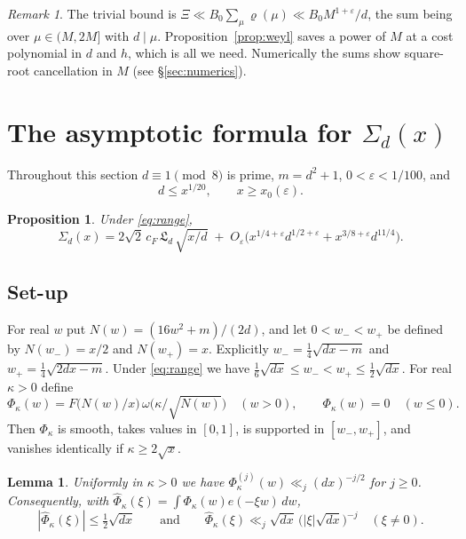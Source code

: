 \documentclass[11pt]{amsart}
\newtheorem{proposition}[theorem]{Proposition}
\newtheorem{lemma}[theorem]{Lemma}
\theoremstyle{remark}
\newtheorem{remark}[theorem]{Remark}
\theoremstyle{definition}
\numberwithin{equation}{section}
\newcommand{\eps}{\varepsilon}
\newcommand{\Lf}{\mathfrak{L}}
\begin{document}
\begin{remark}
The trivial bound is $\Xi\ll B_0\sum_{\mu}\varrho(\mu)\ll B_0M^{1+\eps}/d$, the sum being over $\mu\in(M,2M]$ with $d\mid\mu$. Proposition~\ref{prop:weyl} saves a power of $M$ at a cost polynomial in $d$ and $h$, which is all we need. Numerically the sums show square-root cancellation in $M$ (see \S\ref{sec:numerics}).
\end{remark}

\section{\texorpdfstring{The asymptotic formula for $\Sigma_d(x)$}{The asymptotic formula for Sigma\_d(x)}}\label{sec:asymp}

Throughout this section $d\equiv1\pmod8$ is prime, $m=d^2+1$, $0<\eps<1/100$, and
\begin{equation}\label{eq:range}
d\le x^{1/20},\qquad x\ge x_0(\eps).
\end{equation}

\begin{proposition}\label{prop:asymp}
Under \eqref{eq:range},
\[
\Sigma_d(x)=2\sqrt2\,c_F\,\Lf_d\,\sqrt{x/d}\;+\;O_\eps\bigl(x^{1/4+\eps}d^{1/2+\eps}+x^{3/8+\eps}d^{11/4}\bigr).
\]
\end{proposition}

\subsection{Set-up}
For real $w$ put $N(w)=(16w^2+m)/(2d)$, and let $0<w_-<w_+$ be defined by $N(w_-)=x/2$ and $N(w_+)=x$. Explicitly $w_-=\frac14\sqrt{dx-m}$ and $w_+=\frac14\sqrt{2dx-m}$. Under \eqref{eq:range} we have $\frac16\sqrt{dx}\le w_-<w_+\le\frac12\sqrt{dx}$. For real $\kappa>0$ define
\[
\Phi_\kappa(w)=F\bigl(N(w)/x\bigr)\,\omega\bigl(\kappa/\sqrt{N(w)}\bigr)\quad(w>0),\qquad\Phi_\kappa(w)=0\quad(w\le0).
\]
Then $\Phi_\kappa$ is smooth, takes values in $[0,1]$, is supported in $[w_-,w_+]$, and vanishes identically if $\kappa\ge2\sqrt x$.

\begin{lemma}\label{lem:Phi}
Uniformly in $\kappa>0$ we have $\Phi_\kappa^{(j)}(w)\ll_j(dx)^{-j/2}$ for $j\ge0$. Consequently, with $\hat\Phi_\kappa(\xi)=\int\Phi_\kappa(w)e(-\xi w)\,dw$,
\[
|\hat\Phi_\kappa(\xi)|\le\tfrac12\sqrt{dx}\qquad\text{and}\qquad\hat\Phi_\kappa(\xi)\ll_j\sqrt{dx}\,\bigl(|\xi|\sqrt{dx}\bigr)^{-j}\quad(\xi\ne0).
\]
\end{lemma}
\end{document}
